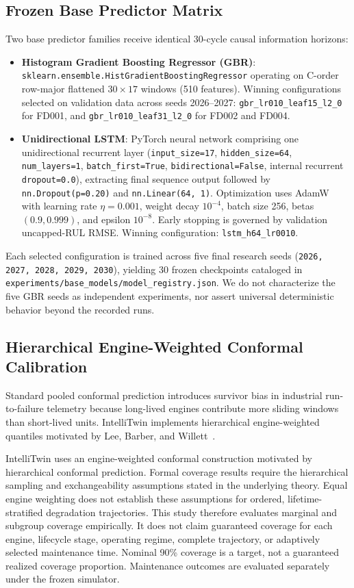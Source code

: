 \subsection{Frozen Base Predictor Matrix}
Two base predictor families receive identical 30-cycle causal information horizons:
\begin{itemize}
  \item \textbf{Histogram Gradient Boosting Regressor (GBR)}: \texttt{sklearn.ensemble.HistGradientBoostingRegressor} operating on C-order row-major flattened $30 \times 17$ windows (510 features). Winning configurations selected on validation data across seeds 2026--2027: \texttt{gbr\_lr010\_leaf15\_l2\_0} for FD001, and \texttt{gbr\_lr010\_leaf31\_l2\_0} for FD002 and FD004.
  \item \textbf{Unidirectional LSTM}: PyTorch neural network comprising one unidirectional recurrent layer (\texttt{input\_size=17}, \texttt{hidden\_size=64}, \texttt{num\_layers=1}, \texttt{batch\_first=True}, \texttt{bidirectional=False}, internal recurrent \texttt{dropout=0.0}), extracting final sequence output followed by \texttt{nn.Dropout(p=0.20)} and \texttt{nn.Linear(64, 1)}. Optimization uses AdamW with learning rate $\eta = 0.001$, weight decay $10^{-4}$, batch size 256, betas $(0.9, 0.999)$, and epsilon $10^{-8}$. Early stopping is governed by validation uncapped-RUL RMSE. Winning configuration: \texttt{lstm\_h64\_lr0010}.
\end{itemize}
Each selected configuration is trained across five final research seeds (\texttt{2026, 2027, 2028, 2029, 2030}), yielding 30 frozen checkpoints cataloged in \texttt{experiments/base\_models/model\_registry.json}. We do not characterize the five GBR seeds as independent experiments, nor assert universal deterministic behavior beyond the recorded runs.

\subsection{Hierarchical Engine-Weighted Conformal Calibration}
Standard pooled conformal prediction introduces survivor bias in industrial run-to-failure telemetry because long-lived engines contribute more sliding windows than short-lived units. IntelliTwin implements hierarchical engine-weighted quantiles motivated by Lee, Barber, and Willett~\cite{lee2023hierarchical}.

IntelliTwin uses an engine-weighted conformal construction motivated by hierarchical conformal prediction. Formal coverage results require the hierarchical sampling and exchangeability assumptions stated in the underlying theory. Equal engine weighting does not establish these assumptions for ordered, lifetime-stratified degradation trajectories. This study therefore evaluates marginal and subgroup coverage empirically. It does not claim guaranteed coverage for each engine, lifecycle stage, operating regime, complete trajectory, or adaptively selected maintenance time. Nominal 90\% coverage is a target, not a guaranteed realized coverage proportion. Maintenance outcomes are evaluated separately under the frozen simulator.


